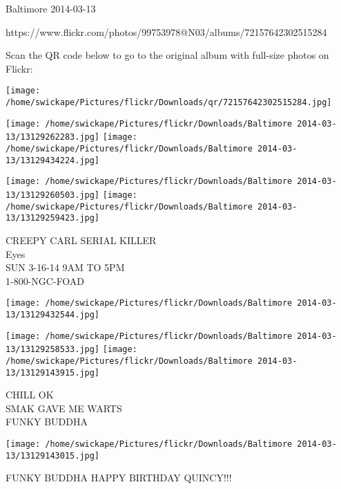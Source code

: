 \documentclass[10pt,letterpaper]{article}
\begin{document}
Baltimore 2014-03-13

https://www.flickr.com/photos/99753978@N03/albums/72157642302515284

Scan the QR code below to go to the original album with full-size photos on Flickr:

\texttt{[image: /home/swickape/Pictures/flickr/Downloads/qr/72157642302515284.jpg]}
\pagebreak

\texttt{[image: /home/swickape/Pictures/flickr/Downloads/Baltimore 2014-03-13/13129262283.jpg]}
\texttt{[image: /home/swickape/Pictures/flickr/Downloads/Baltimore 2014-03-13/13129434224.jpg]}

\texttt{[image: /home/swickape/Pictures/flickr/Downloads/Baltimore 2014-03-13/13129260503.jpg]}
\texttt{[image: /home/swickape/Pictures/flickr/Downloads/Baltimore 2014-03-13/13129259423.jpg]}

CREEPY CARL SERIAL KILLER\\
Eyes\\
SUN 3{-}16{-}14 9AM TO 5PM\\
1{-}800{-}NGC{-}FOAD\\
\pagebreak

\texttt{[image: /home/swickape/Pictures/flickr/Downloads/Baltimore 2014-03-13/13129432544.jpg]}

\vspace{0.25in}
\texttt{[image: /home/swickape/Pictures/flickr/Downloads/Baltimore 2014-03-13/13129258533.jpg]}
\texttt{[image: /home/swickape/Pictures/flickr/Downloads/Baltimore 2014-03-13/13129143915.jpg]}

CHILL OK\\
SMAK GAVE ME WARTS\\
FUNKY BUDDHA\\
\pagebreak

\texttt{[image: /home/swickape/Pictures/flickr/Downloads/Baltimore 2014-03-13/13129143015.jpg]}

FUNKY BUDDHA HAPPY BIRTHDAY QUINCY!!!\\
\pagebreak
\end{document}
